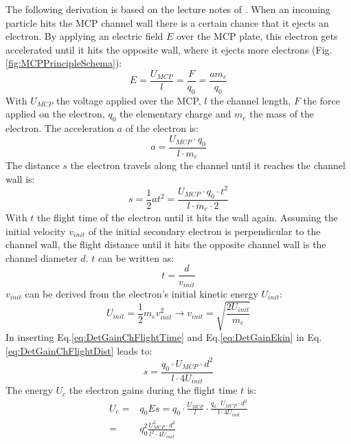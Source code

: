 	The following derivation is based on the lecture notes of \cite{LecNot_Wurz2017}. When an incoming particle hits the MCP channel wall there is a certain chance that it ejects an electron. By applying an electric field $E$ over the MCP plate, this electron gets accelerated until it hits the opposite wall, where it ejects more electrons (Fig.\,\ref{fig:MCPPrincipleSchema}):
	\begin{equation}
		E = \frac{U_{MCP}}{l} = \frac{F}{q_0} = \frac{a m_e}{q_0}
	\end{equation}
	With $U_{MCP}$ the voltage applied over the MCP, $l$ the channel length, $F$ the force applied on the electron, $q_0$ the elementary charge and $m_e$ the mass of the electron. The acceleration $a$ of the electron is:		
	\begin{equation}
		a = \frac{U_{MCP}\cdot q_0}{l\cdot m_e}
	\end{equation}
	The distance $s$ the electron travels along the channel until it reaches the channel wall is:
	\begin{equation}
		s = \frac{1}{2}at^2 = \frac{U_{MCP}\cdot q_0\cdot t^2}{l\cdot m_e\cdot 2}
		\label{eq:DetGainChFlightDist}
	\end{equation}
	With $t$ the flight time of the electron until it hits the wall again. Assuming the initial velocity $v_{init}$ of the initial secondary electron is perpendicular to the channel wall, the flight distance until it hits the opposite channel wall is the channel diameter $d$. $t$ can be written as:
	\begin{equation}
		t = \frac{d}{v_{init}}
		\label{eq:DetGainChFlightTime}
	\end{equation}
	$v_{init}$ can be derived from the electron's initial kinetic energy $U_{init}$:
	\begin{equation}
		U_{init} = \frac{1}{2}m_e v_{init}^2 \rightarrow v_{init} = \sqrt{\frac{2U_{init}}{m_e}}
		\label{eq:DetGainEkin}
	\end{equation}
	In inserting Eq.\eqref{eq:DetGainChFlightTime} and Eq.\eqref{eq:DetGainEkin} in Eq.\eqref{eq:DetGainChFlightDist} leads to:
	\begin{equation}
		s = \frac{q_0 \cdot U_{MCP}\cdot d^2}{l\cdot 4U_{init}}
		\label{eq:DetGainDistECh}
	\end{equation}
	The energy $U_c$ the electron gains during the flight time $t$ is:
	\begin{align}
		U_c =& q_0 Es = q_0\cdot \frac{U_{MCP}}{l}\cdot\frac{q_0\cdot U_{MCP}\cdot d^2}{l\cdot 4 U_{init}}\\
		=& q_0^2 \frac{U_{MCP}^2\cdot d^2}{l^2\cdot 4U_{init}}
	\end{align}
